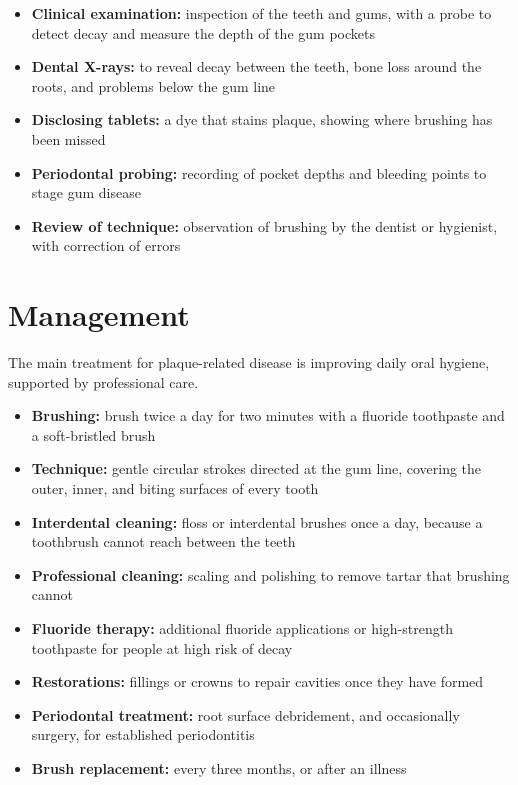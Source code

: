 \begin{itemize}
    \item \textbf{Clinical examination:} inspection of the teeth and gums, with a probe to detect decay and measure the depth of the gum pockets
    \item \textbf{Dental X-rays:} to reveal decay between the teeth, bone loss around the roots, and problems below the gum line
    \item \textbf{Disclosing tablets:} a dye that stains plaque, showing where brushing has been missed
    \item \textbf{Periodontal probing:} recording of pocket depths and bleeding points to stage gum disease
    \item \textbf{Review of technique:} observation of brushing by the dentist or hygienist, with correction of errors
\end{itemize}

\section*{Management}
The main treatment for plaque-related disease is improving daily oral hygiene, supported by professional care.

\begin{itemize}
    \item \textbf{Brushing:} brush twice a day for two minutes with a fluoride toothpaste and a soft-bristled brush
    \item \textbf{Technique:} gentle circular strokes directed at the gum line, covering the outer, inner, and biting surfaces of every tooth
    \item \textbf{Interdental cleaning:} floss or interdental brushes once a day, because a toothbrush cannot reach between the teeth
    \item \textbf{Professional cleaning:} scaling and polishing to remove tartar that brushing cannot
    \item \textbf{Fluoride therapy:} additional fluoride applications or high-strength toothpaste for people at high risk of decay
    \item \textbf{Restorations:} fillings or crowns to repair cavities once they have formed
    \item \textbf{Periodontal treatment:} root surface debridement, and occasionally surgery, for established periodontitis
    \item \textbf{Brush replacement:} every three months, or after an illness
\end{itemize}


